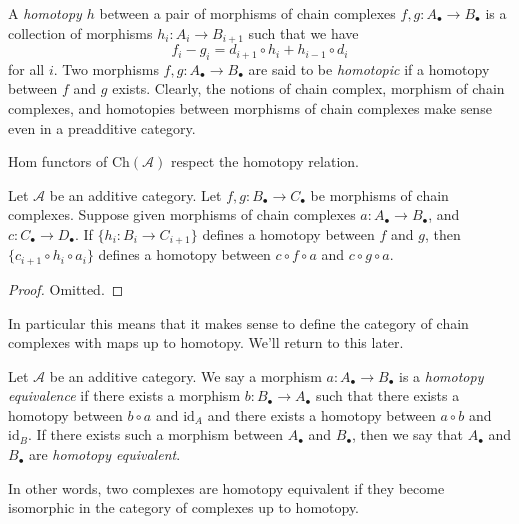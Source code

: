 \medskip\noindent
A {\it homotopy $h$} between a pair of morphisms
of chain complexes $f, g : A_\bullet \to B_\bullet$
is a collection of morphisms $h_i : A_i \to B_{i + 1}$
such that we have
$$
f_i - g_i = d_{i + 1} \circ h_i + h_{i - 1} \circ d_i
$$
for all $i$.
Two morphisms $f, g : A_\bullet \to B_\bullet$ are
said to be {\it homotopic} if a homotopy between $f$
and $g$ exists.
Clearly, the notions of chain complex, morphism of
chain complexes, and homotopies between morphisms of chain complexes
make sense even in a preadditive category.

\begin{lemma}
\label{lemma-compose-homotopy}
\begin{slogan}
Hom functors of $\text{Ch}(\mathcal{A})$ respect the homotopy relation.
\end{slogan}
Let $\mathcal{A}$ be an additive category.
Let $f, g : B_\bullet \to C_\bullet$ be morphisms
of chain complexes. Suppose given morphisms of chain
complexes $a : A_\bullet \to B_\bullet$, and
$c : C_\bullet \to D_\bullet$.
If $\{h_i : B_i \to C_{i + 1}\}$ defines a homotopy
between $f$ and $g$, then $\{c_{i + 1} \circ h_i \circ a_i\}$
defines a homotopy between $c \circ f \circ a$ and
$c \circ g \circ a$.
\end{lemma}

\begin{proof}
Omitted.
\end{proof}

\noindent
In particular this means that it makes sense to define
the category of chain complexes with maps up to homotopy.
We'll return to this later.

\begin{definition}
\label{definition-homotopy-equivalent}
Let $\mathcal{A}$ be an additive category.
We say a morphism $a : A_\bullet \to B_\bullet$
is a {\it homotopy equivalence} if there exists
a morphism $b : B_\bullet \to A_\bullet$
such that there exists a homotopy between
$b \circ a$ and $\text{id}_A$
and there exists a homotopy between $a \circ b$ and $\text{id}_B$.
If there exists such a morphism between $A_\bullet$ and $B_\bullet$, then
we say that $A_\bullet$ and $B_\bullet$ are {\it homotopy equivalent}.
\end{definition}

\noindent
In other words, two complexes are homotopy equivalent if they become
isomorphic in the category of complexes up to homotopy.

